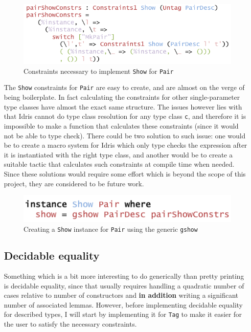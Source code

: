 \documentclass{ituthesis}
\newcommand{\tttype}[1]{\textcolor{type-color}{\texttt{#1}}}
\newcommand{\ttdec}[1]{\textcolor{declared-var-color}{\texttt{#1}}}
\newcommand{\ttvar}[1]{\textcolor{local-var-color}{\texttt{#1}}}
\theoremstyle{break}
\begin{document}
\begin{figure}[ht]
\begin{center}
    \includegraphics[scale=0.5]{Figures/GenericShowConstraints.png}
\end{center}
\caption{Constraints necessary to implement \tttype{Show} for \ttdec{Pair}}
\label{fig:showconstrs}
\end{figure}

The \tttype{Show} constraints for \ttdec{Pair} are easy to create, and are almost on the verge of being boilerplate.
In fact calculating the constraints for other single-parameter type classes have almost the exact same structure.
The issues however lies with that Idris cannot do type class resolution for any type class \ttvar{c}, and therefore it is impossible to make
a function that calculates these constraints (since it would not be able to type check).
There could be two solution to such issue: one would be to create a macro system for Idris which only type checks the expression after it is instantiated with the right type class, and another
would be to create a suitable tactic that calculates such constraints at compile time when needed.
Since these solutions would require some effort which is beyond the scope of this project, they are considered to be future work.

\begin{figure}[ht]
\begin{center}
    \includegraphics[scale=0.5]{Figures/GenericShowInstance.png}
\end{center}
\caption{Creating a \tttype{Show} instance for \ttdec{Pair} using the generic \ttdec{gshow}}
\label{fig:showinst}
\end{figure}

\subsection{Decidable equality}
\label{sub:Decidable equality}
Something which is a bit more interesting to do generically than pretty printing is decidable equality, since that usually
requires handling a quadratic number of cases relative to number of constructors and \textbf{in addition} writing a significant number of associated lemmas.
However, before implementing decidable equality for described types, I will start by implementing it for \tttype{Tag} to make it easier for the user to satisfy
the necessary constraints.
\end{document}
